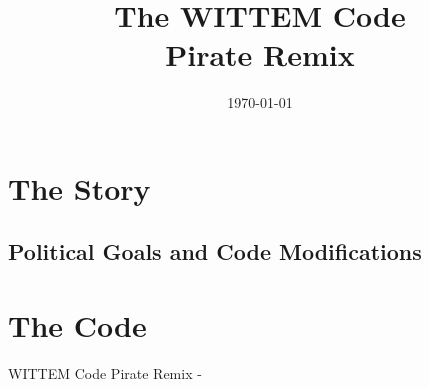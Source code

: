 



\title{The WITTEM Code\\\large Pirate Remix\\\vspace{4ex}\texttt{\WCPRVersion}}
\author{}
\date{\sffamily\today}





\cleardoublepage

\tableofcontents


\chapter{The Story}





\section{Political Goals and Code Modifications}



\chapter{The Code}
WITTEM Code Pirate Remix - \WCPRVersion












